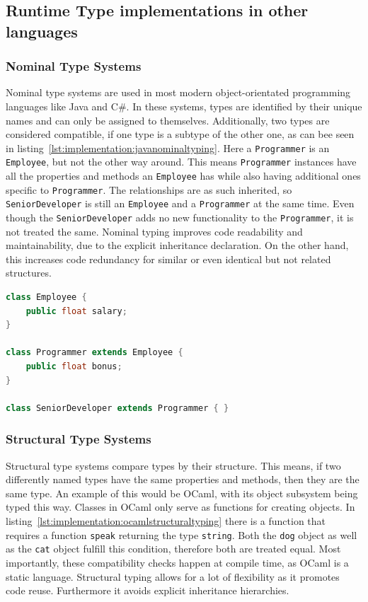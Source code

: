 \subsection{Runtime Type implementations in other languages}
\label{chap:runtime-other-languages}

\subsubsection{Nominal Type Systems}

Nominal type systems are used in most modern object-orientated programming languages like Java and C\#. In these systems, types are identified by their unique names and can only be assigned to themselves. Additionally, two types are considered compatible, if one type is a subtype of the other one, as can bee seen in listing~\ref{lst:implementation:javanominaltyping}. Here a  \lstinline|Programmer| is an \lstinline|Employee|, but not the other way around. This means \lstinline|Programmer| instances have all the properties and methods an \lstinline|Employee| has while also having additional ones specific to \lstinline|Programmer|. The relationships are as such inherited, so \lstinline|SeniorDeveloper| is still an \lstinline|Employee| and a \lstinline|Programmer| at the same time. Even though the \lstinline|SeniorDeveloper| adds no new functionality to the \lstinline|Programmer|, it is not treated the same. Nominal typing improves code readability and maintainability, due to the explicit inheritance declaration. On the other hand, this increases code redundancy for similar or even identical but not related structures.

\begin{lstlisting}[language=Java,caption=Example of nominal typing in Java,label=lst:implementation:javanominaltyping]
class Employee {
	public float salary;
}

class Programmer extends Employee {
	public float bonus;
}

class SeniorDeveloper extends Programmer { }
\end{lstlisting}

\subsubsection{Structural Type Systems}

Structural type systems compare types by their structure. This means, if two differently named types have the same properties and methods, then they are the same type. An example of this would be OCaml, with its object subsystem being typed this way. Classes in OCaml only serve as functions for creating objects. In listing~\ref{lst:implementation:ocamlstructuraltyping} there is a function that requires a function \lstinline|speak| returning the type \lstinline|string|. Both the \lstinline|dog| object as well as the \lstinline|cat| object fulfill this condition, therefore both are treated equal. Most importantly, these compatibility checks happen at compile time, as OCaml is a static language. Structural typing allows for a lot of flexibility as it promotes code reuse. Furthermore it avoids explicit inheritance hierarchies.

